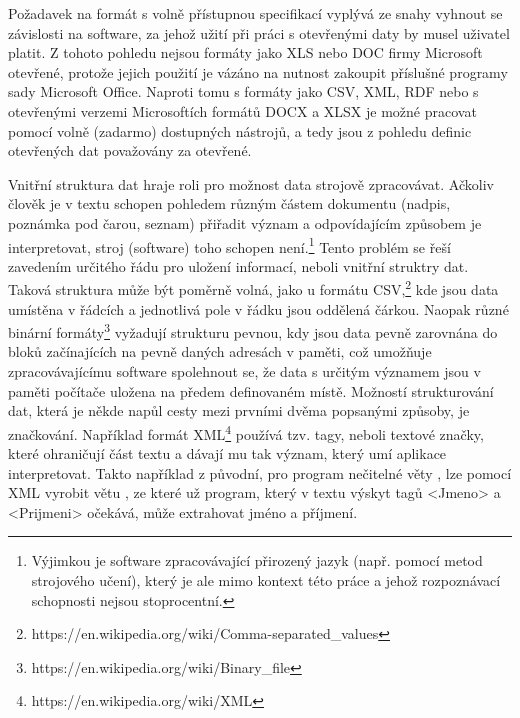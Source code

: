 Požadavek na formát s volně přístupnou specifikací vyplývá ze snahy vyhnout se závislosti na software, za jehož užití při práci s otevřenými daty by musel uživatel platit. Z tohoto pohledu nejsou formáty jako XLS nebo DOC firmy Microsoft otevřené, protože jejich použití je vázáno na nutnost zakoupit příslušné programy sady Microsoft Office. Naproti tomu s formáty jako CSV, XML, RDF nebo s otevřenými verzemi Microsoftích formátů DOCX a XLSX je možné pracovat pomocí volně (zadarmo) dostupných nástrojů, a tedy jsou z pohledu definic otevřených dat považovány za otevřené.

Vnitřní struktura dat hraje roli pro možnost data strojově zpracovávat. Ačkoliv člověk je v textu schopen pohledem různým částem dokumentu (nadpis, poznámka pod čarou, seznam) přiřadit význam a odpovídajícím způsobem je interpretovat, stroj (software) toho schopen není.\footnote{Výjimkou je software zpracovávající přirozený jazyk (např. pomocí metod strojového učení), který je ale mimo kontext této práce a jehož rozpoznávací schopnosti nejsou stoprocentní.} Tento problém se řeší zavedením určitého řádu pro uložení informací, neboli vnitřní struktry dat. Taková struktura může být poměrně volná, jako u formátu CSV,\footnote{https://en.wikipedia.org/wiki/Comma-separated\_values} kde jsou data umístěna v řádcích a jednotlivá pole v řádku jsou oddělená čárkou. Naopak různé binární formáty\footnote{https://en.wikipedia.org/wiki/Binary\_file} vyžadují strukturu pevnou, kdy jsou data pevně zarovnána do bloků začínajících na pevně daných adresách v paměti, což umožňuje zpracovávajícímu software spolehnout se, že data s určitým významem jsou v paměti počítače uložena na předem definovaném místě. Možností strukturování dat, která je někde napůl cesty mezi prvními dvěma popsanými způsoby, je značkování. Například formát XML\footnote{https://en.wikipedia.org/wiki/XML} používá tzv. tagy, neboli textové značky, které ohraničují část textu a dávají mu tak význam, který umí aplikace interpretovat. Takto například  z původní, pro program nečitelné věty \textit{}, lze pomocí XML vyrobit větu \textit{}, ze které už program, který v textu výskyt tagů \textsf{<Jmeno>} a \textsf{<Prijmeni>} očekává, může extrahovat jméno a příjmení.

